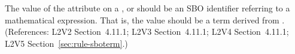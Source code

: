 The value of the  attribute on a \AlgebraicRule, \RateRule or
\AssignmentRule should be an SBO identifier referring to a mathematical
expression.  That is, the value should be a term derived from
\sbomathformula.  (References: L2V2 Section~4.11.1;
L2V3 Section~4.11.1; L2V4 Section~4.11.1; L2V5 Section~\ref{sec:rule-sboterm}.)
